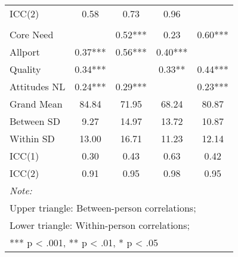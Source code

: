 \begin{table}
\begin{minipage}[t][\textheight][t]{\textwidth}
{\begin{tabular}[t]{lcccc}
\hspace{1em}ICC(2) & 0.58 & 0.73 & 0.96 & \\
\addlinespace[0.3em]
\multicolumn{5}{l}{\textbf{Study 3}}\\
\hspace{1em}Core Need &  & 0.52*** & 0.23 & 0.60***\\
\hspace{1em}Allport & 0.37*** & 0.56*** & 0.40*** & \\
\hspace{1em}Quality & 0.34*** &  & 0.33** & 0.44***\\
\hspace{1em}Attitudes NL & 0.24*** & 0.29*** &  & 0.23***\\
\addlinespace
\hspace{1em}Grand Mean & 84.84 & 71.95 & 68.24 & 80.87\\
\hspace{1em}Between SD & 9.27 & 14.97 & 13.72 & 10.87\\
\hspace{1em}Within SD & 13.00 & 16.71 & 11.23 & 12.14\\
\hspace{1em}ICC(1) & 0.30 & 0.43 & 0.63 & 0.42\\
\hspace{1em}ICC(2) & 0.91 & 0.95 & 0.98 & 0.95\\
\bottomrule
\multicolumn{5}{l}{\rule{0pt}{1em}\textit{Note: }}\\
\multicolumn{5}{l}{\rule{0pt}{1em}Upper triangle: Between-person correlations;}\\
\multicolumn{5}{l}{\rule{0pt}{1em}Lower triangle: Within-person correlations;}\\
\multicolumn{5}{l}{\rule{0pt}{1em}*** p < .001, ** p < .01,  * p < .05}\\
\end{tabular}}
\end{minipage}
\end{table}
